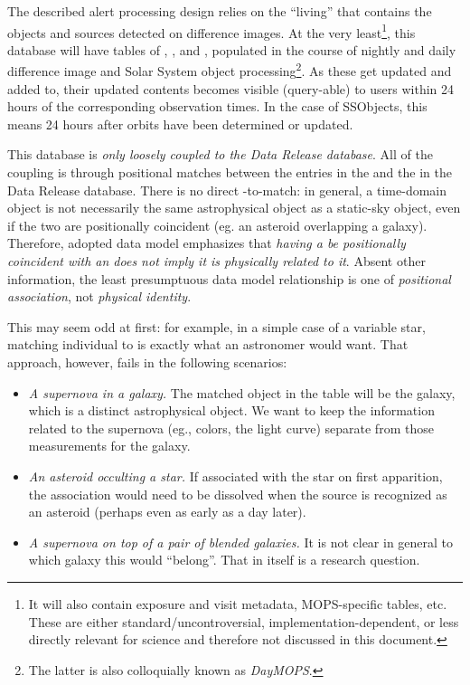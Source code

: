 \documentclass[SE,lsstdraft,toc]{lsstdoc}
\renewcommand{\DR}{{Data Release database}\xspace}
\begin{document}
The described alert processing design relies on the ``living'' \PPDB that contains the objects and sources detected on difference images. At the very least\footnote{It will also contain exposure and visit metadata, MOPS-specific tables, etc. These are either standard/uncontroversial, implementation-dependent, or less directly relevant for science and therefore not discussed in this document.}, this database will have tables of \DIASources, \DIAObjects, and \SSObjects, populated in the course of nightly and daily difference image and Solar System object processing\footnote{The latter is also colloquially known as \emph{DayMOPS}.}. As these get updated and added to, their updated contents becomes visible (query-able) to users within 24 hours of the corresponding observation times. In the case of SSObjects, this means 24 hours after orbits have been determined or updated.


This database is \emph{only loosely coupled to the \DR}. All of the coupling is through positional matches between the \DIAObjects entries in the \PPDB and the \Objects in the \DR {}. There is no direct \DIASource-to-\Object match:
in general, a time-domain object is not necessarily the same astrophysical object as a static-sky object, even if the two are
positionally coincident (eg. an asteroid overlapping a galaxy).
Therefore, adopted data model emphasizes that \emph{having a \DIASource be positionally coincident with an \Object does not imply it is physically related to it}. Absent other information, the least presumptuous data model relationship is one of \emph{positional association}, not \emph{physical identity}.

This may seem odd at first: for example, in a simple case of a variable star, matching individual \DIASources to \Objects is exactly what an astronomer would want. That approach, however, fails in the following scenarios:
\begin{itemize}
    \item \emph{A supernova in a galaxy.} The matched object in the \Object table will be the galaxy, which is a distinct astrophysical object. We want to keep the information related to the supernova (eg., colors, the light curve) separate from those measurements for the galaxy.
    \item \emph{An asteroid occulting a star.} If associated with the star on first apparition, the association would need to be dissolved when the source is recognized as an asteroid (perhaps even as early as a day later).
    \item \emph{A supernova on top of a pair of blended galaxies.} It is not clear in general to which galaxy this \DIASource would ``belong''. That in itself is a research question.
\end{itemize}
\end{document}
